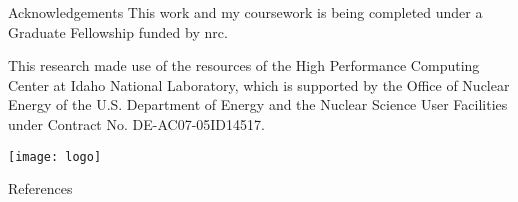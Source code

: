 \documentclass[aspectratio=169,pdftex,dvipsnames]{beamer}
\newcommand\noside{\addtolength\textwidth{2cm} 
\setlength\hsize{\textwidth} 
\setlength\columnwidth{\textwidth}
\vfill\centering}
\newcommand{\acf}{\acrfull} %
\begin{document}
\begin{frame}{Acknowledgements}
    \centering
    This work and my coursework is being completed under a Graduate Fellowship funded by \acf{nrc}.

    This research made use of the resources of the High Performance Computing Center at Idaho National Laboratory, which is supported by the Office of Nuclear Energy of the U.S. Department of Energy and the Nuclear Science User Facilities under Contract No. DE-AC07-05ID14517.
\end{frame}

\begin{frame}[plain]{}
    \noside
    \texttt{[image: logo]}
    \vfill
\end{frame}

\begin{frame}[allowframebreaks]{References}
    
    \footnotesize
    
\end{frame}

\end{document}
